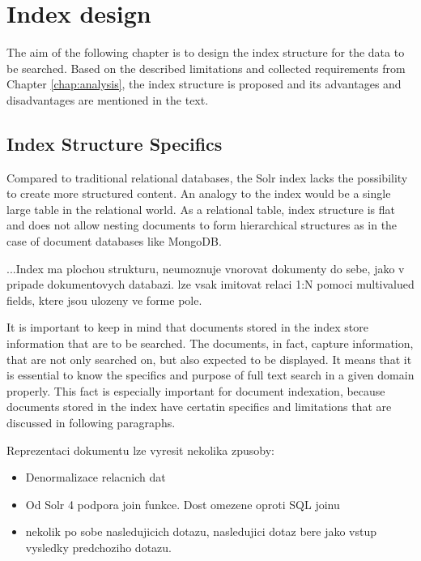 \documentclass[12pt, oneside, a4paper]{book}
\begin{document}
\chapter{Index design}

The aim of the following chapter is to design the index structure for the data to be searched. 
Based on the described limitations and collected requirements from Chapter \ref{chap:analysis}, the index structure is proposed and its advantages and disadvantages are mentioned in the text. 

\section{Index Structure Specifics}

Compared to traditional relational databases, the Solr index lacks
the possibility to create more structured content. An analogy to the
index would be a single large table in the relational world. As a
relational table, index structure is flat and does not allow nesting
documents to form hierarchical structures as in the case of document
databases like MongoDB.

...Index ma plochou strukturu, neumoznuje vnorovat dokumenty
do sebe, jako v pripade dokumentovych databazi. lze vsak imitovat
relaci 1:N pomoci multivalued fields, ktere jsou ulozeny ve forme
pole.

It is important to keep in mind that documents stored in the index store information that are to be searched.
The documents, in fact, capture information, that are not only searched on, but also expected to be displayed.
It means that it is essential to know the specifics and purpose of full text search in a given domain properly.
This fact is especially important for document indexation, because documents stored in the index have certatin specifics and limitations that are discussed in following paragraphs.


Reprezentaci dokumentu lze vyresit nekolika zpusoby:
\begin{itemize}
\item Denormalizace relacnich dat
\item Od Solr 4 podpora join funkce. Dost omezene oproti SQL joinu
\item nekolik po sobe nasledujicich dotazu, nasledujici dotaz
bere jako vstup vysledky predchoziho dotazu.
\end{itemize}
\end{document}
